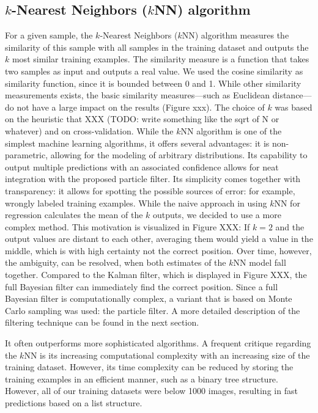 \subsection{$k$-Nearest Neighbors ($k$NN) algorithm}


For a given sample, the $k$-Nearest Neighbors ($k$NN) algorithm measures the similarity of this sample with all samples in the training dataset and outputs the $k$ most similar training examples. The similarity measure is a function that takes two samples as input and outputs a real value. We used the cosine similarity as similarity function, since it is bounded between 0 and 1. While other similarity measurements exists, the basic similarity measures—such as Euclidean distance—do not have a large impact on the results (Figure xxx). The choice of $k$ was based on the heuristic that XXX (TODO: write something like the sqrt of N or whatever) and on cross-validation.  
While the $k$NN algorithm is one of the simplest machine learning algorithms, it
offers several advantages: it is non-parametric, allowing for the
modeling of arbitrary distributions. Its capability to output multiple
predictions with an associated confidence allows for neat integration
with the proposed particle filter. Its simplicity comes together with transparency: it allows for spotting the possible sources of error: for example, wrongly labeled training examples. While the naive approach in using $k$NN for regression calculates the mean of the $k$ outputs, we decided to use a more complex method. This motivation is visualized in Figure XXX: If $k=2$ and the output values are distant to each other, averaging them would yield a value in the middle, which is with high certainty not the correct position. Over time, however, the ambiguity, can be resolved, when both estimates of the $k$NN model fall together. Compared to the Kalman filter, which is displayed in Figure XXX, the full Bayesian filter can immediately find the correct position. Since a full Bayesian filter is computationally complex, a variant that is based on Monte Carlo sampling was used: the particle filter. A more detailed description of the filtering technique can be found in the next section.  


It often outperforms more sophisticated algorithms. A frequent critique regarding the $k$NN is its increasing computational complexity with an increasing size of the training dataset. However, its time complexity can be reduced by storing the training examples in an efficient manner, such as a binary tree structure. However, all of our training datasets were below 1000 images, resulting in fast predictions based on a list structure. 